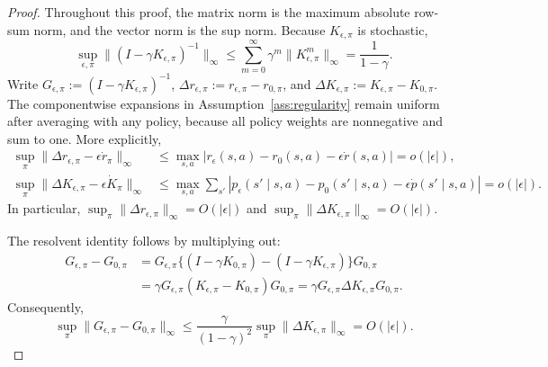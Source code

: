 \documentclass[12pt]{article}
\theoremstyle{remark}\newtheorem{remark}[theorem]{Remark}\theoremstyle{plain}
\begin{document}
\begin{proof}
    Throughout this proof, the matrix norm is the maximum absolute
    row-sum norm, and the vector norm is the sup norm.  Because
    $K_{\epsilon,\pi}$ is stochastic,
    \[
        \sup_{\epsilon,\pi}
        \|(I-\gamma K_{\epsilon,\pi})^{-1}\|_\infty
        \leq
        \sum_{m=0}^{\infty}\gamma^m
        \|K_{\epsilon,\pi}^m\|_\infty
        =\frac1{1-\gamma}.
    \]
    Write
    $G_{\epsilon,\pi}:=(I-\gamma K_{\epsilon,\pi})^{-1}$,
    $\Delta r_{\epsilon,\pi}:=
      r_{\epsilon,\pi}-r_{0,\pi}$, and
    $\Delta K_{\epsilon,\pi}:=
      K_{\epsilon,\pi}-K_{0,\pi}$.
    The componentwise expansions in
    Assumption~\ref{ass:regularity} remain uniform after averaging
    with any policy, because all policy weights are nonnegative and
    sum to one.  More explicitly,
    \[
        \begin{aligned}
        \sup_{\pi}\|
        \Delta r_{\epsilon,\pi}-\epsilon\dot r_\pi
        \|_\infty
        &\leq
        \max_{s,a}|r_\epsilon(s,a)-r_0(s,a)
        -\epsilon\dot r(s,a)|
        =o(|\epsilon|),\\
        \sup_{\pi}\|
        \Delta K_{\epsilon,\pi}-\epsilon\dot K_\pi
        \|_\infty
        &\leq
        \max_{s,a}\sum_{s'}
        |p_\epsilon(s'\mid s,a)-p_0(s'\mid s,a)
        -\epsilon\dot p(s'\mid s,a)|
        =o(|\epsilon|).
        \end{aligned}
    \]
    In particular,
    $\sup_\pi\|\Delta r_{\epsilon,\pi}\|_\infty=O(|\epsilon|)$
    and
    $\sup_\pi\|\Delta K_{\epsilon,\pi}\|_\infty=O(|\epsilon|)$.

    The resolvent identity follows by multiplying out:
    \[
        \begin{aligned}
        G_{\epsilon,\pi}-G_{0,\pi}
        &=
        G_{\epsilon,\pi}
        \{(I-\gamma K_{0,\pi})
          -(I-\gamma K_{\epsilon,\pi})\}
        G_{0,\pi}\\
        &=
        \gamma G_{\epsilon,\pi}
        (K_{\epsilon,\pi}-K_{0,\pi})G_{0,\pi}
        =
        \gamma G_{\epsilon,\pi}
        \Delta K_{\epsilon,\pi}G_{0,\pi}.
        \end{aligned}
    \]
    Consequently,
    \[
        \sup_\pi\|G_{\epsilon,\pi}-G_{0,\pi}\|_\infty
        \leq
        \frac{\gamma}{(1-\gamma)^2}
        \sup_\pi\|\Delta K_{\epsilon,\pi}\|_\infty
        =O(|\epsilon|).
    \]


\end{proof}
\end{document}
